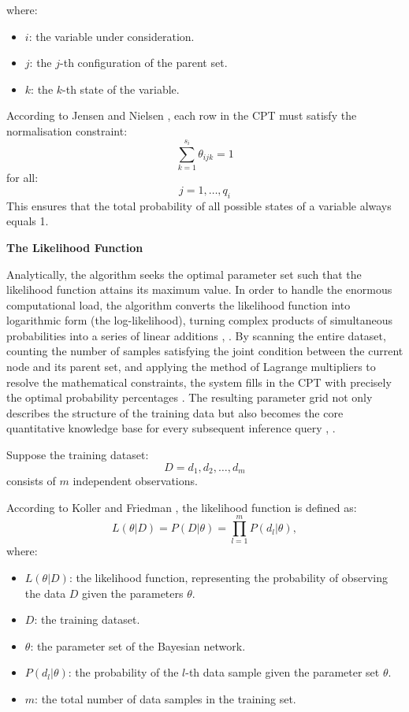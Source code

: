 \noindent
where:

\begin{itemize}
    \item $i$: the variable under consideration.
    \item$j$: the $j$-th configuration of the parent set.
    \item $k$: the $k$-th state of the variable.
\end{itemize}

\vspace{1em}
According to Jensen and Nielsen \cite{jensen2007bayesian}, each row in the CPT must satisfy the normalisation constraint:
$$\sum_{k=1}^{s_i} \theta_{ijk} = 1$$
for all:
$$j=1,\ldots,q_i$$
This ensures that the total probability of all possible states of a variable always equals 1.

\vspace{1em}
\noindent
\textbf{The Likelihood Function}

\noindent
Analytically, the algorithm seeks the optimal parameter set such that the likelihood function attains its maximum value. In order to handle the enormous computational load, the algorithm converts the likelihood function into logarithmic form (the log-likelihood), turning complex products of simultaneous probabilities into a series of linear additions \cite{koller2009probabilistic}, \cite{liu2024credit}. By scanning the entire dataset, counting the number of samples satisfying the joint condition between the current node and its parent set, and applying the method of Lagrange multipliers to resolve the mathematical constraints, the system fills in the CPT with precisely the optimal probability percentages \cite{liu2024credit}. The resulting parameter grid not only describes the structure of the training data but also becomes the core quantitative knowledge base for every subsequent inference query \cite{darwiche2009modeling}, \cite{liu2024credit}. 

\vspace{1em}
\noindent
Suppose the training dataset:
$$D={d_1,d_2,\ldots,d_m}$$
consists of $m$ independent observations.

\vspace{1em}
According to Koller and Friedman \cite{koller2009probabilistic}, the likelihood function is defined as:
\begin{equation}
    L(\theta|D) = P(D|\theta) = \prod_{l=1}^{m} P(d_l|\theta),
\end{equation}
where:
\begin{itemize}
    \item $L(\theta|D)$: the likelihood function, representing the probability of observing the data $D$ given the parameters $\theta$.
    \item $D$: the training dataset.
    \item $\theta$: the parameter set of the Bayesian network.
    \item $P(d_l|\theta)$: the probability of the $l$-th data sample given the parameter set $\theta$.
    \item $m$: the total number of data samples in the training set.
\end{itemize}

